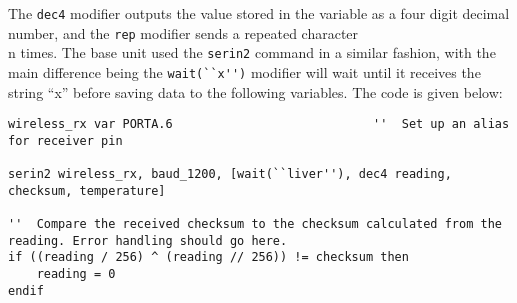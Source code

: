 The \verb|dec4| modifier outputs the value stored in the variable as a four digit decimal number, and the \verb|rep| modifier sends a repeated character \\n times. The base unit used the \verb|serin2| command in a similar fashion, with the main difference being the \verb|wait(``x'')| modifier will wait until it receives the string ``x'' before saving data to the following variables. The code is given below:

\begin{lstlisting}
wireless_rx var PORTA.6                            ''  Set up an alias for receiver pin

serin2 wireless_rx, baud_1200, [wait(``liver''), dec4 reading, checksum, temperature]

''  Compare the received checksum to the checksum calculated from the reading. Error handling should go here.
if ((reading / 256) ^ (reading // 256)) != checksum then
    reading = 0
endif
\end{lstlisting}


